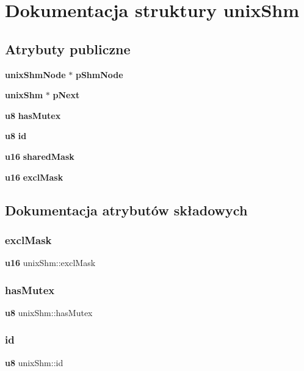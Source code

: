 \section{Dokumentacja struktury unix\+Shm}
\label{structunix_shm}
\subsection*{Atrybuty publiczne}
\begin{DoxyCompactItemize}
\item 
\textbf{ unix\+Shm\+Node} $\ast$ \textbf{ p\+Shm\+Node}
\item 
\textbf{ unix\+Shm} $\ast$ \textbf{ p\+Next}
\item 
\textbf{ u8} \textbf{ has\+Mutex}
\item 
\textbf{ u8} \textbf{ id}
\item 
\textbf{ u16} \textbf{ shared\+Mask}
\item 
\textbf{ u16} \textbf{ excl\+Mask}
\end{DoxyCompactItemize}


\subsection{Dokumentacja atrybutów składowych}
\mbox{\label{structunix_shm_ac6f786d95952e51cab941cbfb9243c8e}} 
\subsubsection{exclMask}
{\footnotesize\ttfamily \textbf{ u16} unix\+Shm\+::excl\+Mask}

\mbox{\label{structunix_shm_a43903be262472299c5eee917ba7c523c}} 
\subsubsection{hasMutex}
{\footnotesize\ttfamily \textbf{ u8} unix\+Shm\+::has\+Mutex}

\mbox{\label{structunix_shm_a88a5e7161ff31f85740dbfc0ba7ad38a}} 
\subsubsection{id}
{\footnotesize\ttfamily \textbf{ u8} unix\+Shm\+::id}


